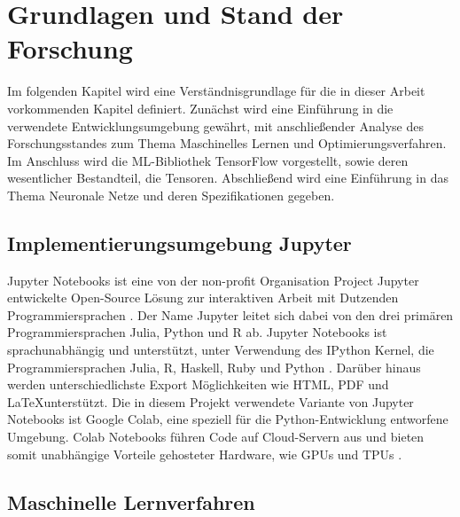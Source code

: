 \chapter{Grundlagen und Stand der Forschung}

Im folgenden Kapitel wird eine Verständnisgrundlage für die in dieser Arbeit vorkommenden Kapitel definiert. Zunächst wird eine Einführung in die verwendete Entwicklungsumgebung gewährt, mit anschließender Analyse des Forschungsstandes zum Thema Maschinelles Lernen und Optimierungsverfahren. Im Anschluss wird die \ac{ML}-Bibliothek TensorFlow vorgestellt, sowie deren wesentlicher Bestandteil, die Tensoren. Abschließend wird eine Einführung in das Thema Neuronale Netze und deren Spezifikationen gegeben.

\section{Implementierungsumgebung Jupyter}
\par
Jupyter Notebooks ist eine von der non-profit Organisation Project Jupyter entwickelte Open-Source Lösung zur interaktiven Arbeit mit Dutzenden Programmiersprachen \cite{project_jupyter}. Der Name Jupyter leitet sich dabei von den drei primären Programmiersprachen Julia, Python und R ab. Jupyter Notebooks ist sprachunabhängig und unterstützt, unter Verwendung des IPython \gls{Kernel}, die Programmiersprachen Julia, R, Haskell, Ruby und Python \cite{jupyter_kernel}. Darüber hinaus werden unterschiedlichste Export Möglichkeiten wie \ac{HTML}, \ac{PDF} und \LaTeX \space unterstützt. Die in diesem Projekt verwendete Variante von Jupyter Notebooks ist Google Colab, eine speziell für die Python-Entwicklung entworfene Umgebung. Colab Notebooks führen Code auf Cloud-Servern aus und bieten somit unabhängige Vorteile gehosteter Hardware, wie \acp{GPU} und \acp{TPU} \cite{colab_notebooks}.

\section{Maschinelle Lernverfahren}\label{sec:machine_learning}

